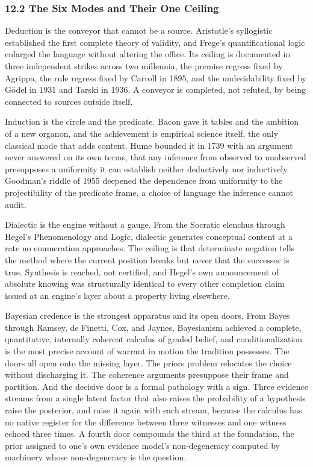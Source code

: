 \documentclass[10pt,twocolumn]{article}
\begin{document}
\hypertarget{the-six-modes-and-their-one-ceiling}{%
\subsubsection{12.2 The Six Modes and Their One
Ceiling}\label{the-six-modes-and-their-one-ceiling}}

Deduction is the conveyor that cannot be a source. Aristotle's
syllogistic established the first complete theory of validity, and
Frege's quantificational logic enlarged the language without altering
the office. Its ceiling is documented in three independent strikes
across two millennia, the premise regress fixed by Agrippa, the rule
regress fixed by Carroll in 1895, and the undecidability fixed by Gödel
in 1931 and Tarski in 1936. A conveyor is completed, not refuted, by
being connected to sources outside itself.

Induction is the circle and the predicate. Bacon gave it tables and the
ambition of a new organon, and the achievement is empirical science
itself, the only classical mode that adds content. Hume bounded it in
1739 with an argument never answered on its own terms, that any
inference from observed to unobserved presupposes a uniformity it can
establish neither deductively nor inductively. Goodman's riddle of 1955
deepened the dependence from uniformity to the projectibility of the
predicate frame, a choice of language the inference cannot audit.

Dialectic is the engine without a gauge. From the Socratic elenchus
through Hegel's Phenomenology and Logic, dialectic generates conceptual
content at a rate no enumeration approaches. The ceiling is that
determinate negation tells the method where the current position breaks
but never that the successor is true. Synthesis is reached, not
certified, and Hegel's own announcement of absolute knowing was
structurally identical to every other completion claim issued at an
engine's layer about a property living elsewhere.

Bayesian credence is the strongest apparatus and its open doors. From
Bayes through Ramsey, de Finetti, Cox, and Jaynes, Bayesianism achieved
a complete, quantitative, internally coherent calculus of graded belief,
and conditionalization is the most precise account of warrant in motion
the tradition possesses. The doors all open onto the missing layer. The
priors problem relocates the choice without discharging it. The
coherence arguments presuppose their frame and partition. And the
decisive door is a formal pathology with a sign. Three evidence streams
from a single latent factor that also raises the probability of a
hypothesis raise the posterior, and raise it again with each stream,
because the calculus has no native register for the difference between
three witnesses and one witness echoed three times. A fourth door
compounds the third at the foundation, the prior assigned to one's own
evidence model's non-degeneracy computed by machinery whose
non-degeneracy is the question.
\end{document}
